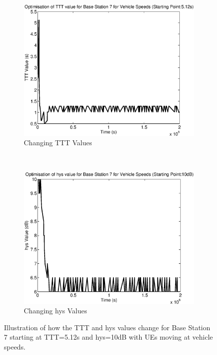 \begin{figure}[H]
        \centering
        \begin{subfigure}[b]{0.49\textwidth}
                \includegraphics[width=\textwidth]{figures/graphs/vehhigh/TTT7.eps}
                \caption{Changing TTT Values}
        \end{subfigure}%
        ~ %
        \begin{subfigure}[b]{0.49\textwidth}
                \includegraphics[width=\textwidth]{figures/graphs/vehhigh/hys7.eps}
                \caption{Changing hys Values}
        \end{subfigure}
        \caption{Illustration of how the TTT and hys values change for Base Station 7 starting at TTT=5.12s and hys=10dB with UEs moving at vehicle speeds.}
\end{figure}
